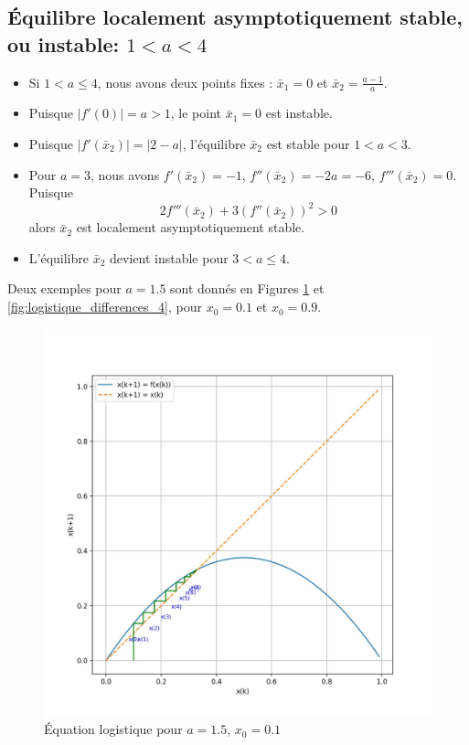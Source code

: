         \subsection{Équilibre localement asymptotiquement stable, ou instable: $1 < a < 4$}
            \begin{itemize}
                \item Si $1 < a \leq 4$, nous avons deux points fixes : $\bar{x}_1 = 0$ et $\bar{x}_2 = \frac{a - 1}{a}$.
                \item Puisque $|f'(0)| = a > 1$, le point $\bar{x}_1 = 0$ est instable.
                \item Puisque $|f'(\bar{x}_2)| = |2 - a|$, l'équilibre $\bar{x}_2$ est stable pour $1 < a < 3$.
                \item Pour $a = 3$, nous avons $f'(\bar{x}_2) = -1$, $f''(\bar{x}_2) = -2a = -6$, $f'''(\bar{x}_2) = 0$. Puisque
                \begin{equation}
                    2f'''(\bar{x}_2) + 3(f''(\bar{x}_2))^2 > 0
                \end{equation}
                alors $\bar{x}_2$ est localement asymptotiquement stable.
                \item L’équilibre $\bar{x}_2$ devient instable pour $3 < a \leq 4$.
            \end{itemize}
            Deux exemples pour $a=1.5$ sont donnés en Figures \ref{fig:logistique_differences_3} et \ref{fig:logistique_differences_4}, pour $x_0=0.1$ et $x_0=0.9$.
            \begin{figure}[ht!]
                \centering
                \includegraphics[width=\textwidth]{images/logistique_differences_3.jpg}
                \caption{Équation logistique pour $a=1.5$, $x_0=0.1$}
                \label{fig:logistique_differences_3}
            \end{figure}
